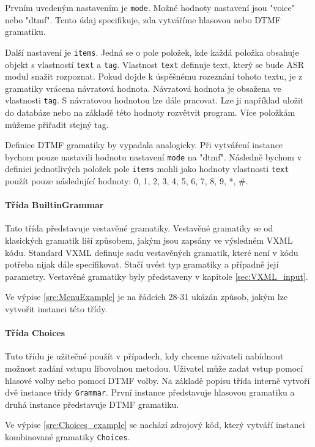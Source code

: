 \documentclass[ing,male,java,dept460,twoside]{diploma}						%
\begin{document}
Prvním uvedeným nastavením je \texttt{mode}. Možné hodnoty nastavení jsou "voice" nebo "dtmf". Tento údaj specifikuje, zda vytváříme hlasovou nebo DTMF gramatiku.

Další nastavení je \texttt{items}. Jedná se o pole položek, kde každá položka obsahuje objekt s vlastností \texttt{text} a \texttt{tag}. Vlastnost \texttt{text} definuje text, který se bude ASR modul snažit rozpoznat. Pokud dojde k úspěšnému rozeznání tohoto textu, je z gramatiky vrácena návratová hodnota. Návratová hodnota je obsažena ve vlastnosti \texttt{tag}. S návratovou hodnotou lze dále pracovat. Lze ji například uložit do databáze nebo na základě této hodnoty rozvětvit program. Více položkám můžeme přiřadit stejný tag.

Definice DTMF gramatiky by vypadala analogicky. Při vytváření instance bychom pouze nastavili hodnotu nastavení \texttt{mode} na "dtmf". Následně bychom v definici jednotlivých položek pole \texttt{items} mohli jako hodnoty vlastnosti \texttt{text} použít pouze následující hodnoty: 0, 1, 2, 3, 4, 5, 6, 7, 8, 9, *, \#.

\paragraph{Třída BuiltinGrammar}
\label{sec:BuiltinGrammar}
Tato třída představuje vestavěné gramatiky. Vestavěné gramatiky se od klasických gramatik liší způsobem, jakým jsou zapsány ve výsledném VXML kódu. Standard VXML definuje sadu vestavěných gramatik, které není v kódu potřeba nijak dále specifikovat. Stačí uvést typ gramatiky a případně její parametry. Vestavěné gramatiky byly představeny v kapitole \ref{sec:VXML_input}.

Ve výpise \ref{src:MenuExample} je na řádcích 28-31 ukázán způsob, jakým lze vytvořit instanci této třídy.

\paragraph{Třída Choices}
\label{sec:Choices}
Tuto třídu je užitečné použít v případech, kdy chceme uživateli nabídnout možnost zadání vstupu libovolnou metodou. Uživatel může zadat vstup pomocí hlasové volby nebo pomocí DTMF volby. Na základě popisu třída interně vytvoří dvě instance třídy \texttt{Grammar}. První instance představuje hlasovou gramatiku a druhá instance představuje DTMF gramatiku.

Ve výpise \ref{src:Choices_example} se nachází zdrojový kód, který vytváří instanci kombinované gramatiky \texttt{Choices}.
\end{document}
